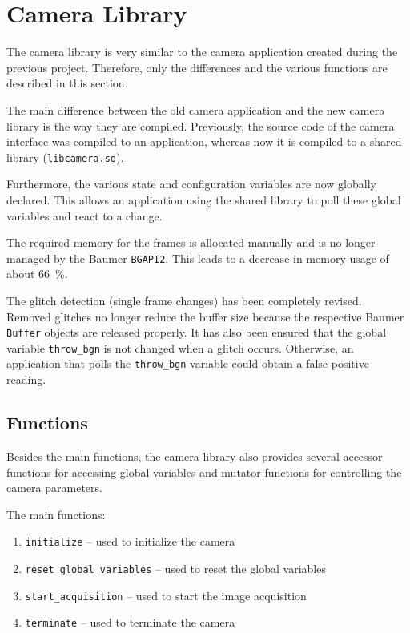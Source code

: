 \section{Camera Library}
\label{sec:inference:camera_library}

The camera library is very similar to the camera application created during the previous project.
Therefore, only the differences and the various functions are described in this section.

The main difference between the old camera application and the new camera library is the way they are compiled.
Previously, the source code of the camera interface was compiled to an application, whereas now it is compiled to a shared library (\texttt{libcamera.so}).

Furthermore, the various state and configuration variables are now globally declared.
This allows an application using the shared library to poll these global variables and react to a change.

The required memory for the frames is allocated manually and is no longer managed by the Baumer \texttt{BGAPI2}.
This leads to a decrease in memory usage of about \SI{66}{\percent}.

The glitch detection (single frame changes) has been completely revised.
Removed glitches no longer reduce the buffer size because the respective Baumer \texttt{Buffer} objects are released properly.
It has also been ensured that the global variable \texttt{throw\_bgn} is not changed when a glitch occurs.
Otherwise, an application that polls the \texttt{throw\_bgn} variable could obtain a false positive reading.

\subsection{Functions}
\label{subsec:inference:camera_library:functions}

Besides the main functions, the camera library also provides several accessor functions for accessing global variables and mutator functions for controlling the camera parameters.

The main functions:

\begin{enumerate}
  \item \texttt{initialize} -- used to initialize the camera
  \item \texttt{reset\_global\_variables} -- used to reset the global variables
  \item \texttt{start\_acquisition} -- used to start the image acquisition
  \item \texttt{terminate} -- used to terminate the camera
\end{enumerate}

